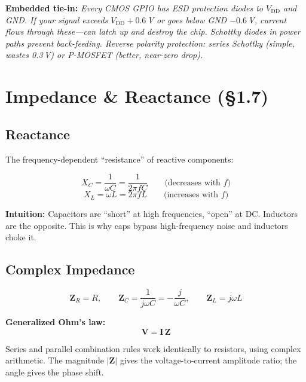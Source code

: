 \documentclass[11pt,a4paper]{article}
\newcommand{\intuition}[1]{\par\textcolor{intuition}{\textbf{Intuition:}} #1}
\newcommand{\embedded}[1]{\par\textcolor{embed}{\textbf{Embedded tie-in:}} \textit{#1}}
\begin{document}
\embedded{Every CMOS GPIO has ESD protection diodes to $V_{\text{DD}}$ and GND. If your signal exceeds $V_{\text{DD}} + 0.6\,$V or goes below GND $- 0.6\,$V, current flows through these---can latch up and destroy the chip. Schottky diodes in power paths prevent back-feeding. Reverse polarity protection: series Schottky (simple, wastes 0.3\,V) or P-MOSFET (better, near-zero drop).}

\section{Impedance \& Reactance (\S1.7)}

\subsection{Reactance}

The frequency-dependent ``resistance'' of reactive components:

\begin{equation}
\boxed{X_C = \frac{1}{\omega C} = \frac{1}{2\pi f C}} \qquad \text{(decreases with }f\text{)}
\end{equation}
\begin{equation}
\boxed{X_L = \omega L = 2\pi f L} \qquad \text{(increases with }f\text{)}
\end{equation}

\intuition{Capacitors are ``short'' at high frequencies, ``open'' at DC. Inductors are the opposite. This is why caps bypass high-frequency noise and inductors choke it.}

\subsection{Complex Impedance}

\begin{equation}
\mathbf{Z}_R = R, \qquad
\mathbf{Z}_C = \frac{1}{j\omega C} = -\frac{j}{\omega C}, \qquad
\mathbf{Z}_L = j\omega L
\end{equation}

\textbf{Generalized Ohm's law:}
\begin{equation}
\mathbf{V} = \mathbf{I}\,\mathbf{Z}
\end{equation}

Series and parallel combination rules work identically to resistors, using complex arithmetic. The magnitude $|\mathbf{Z}|$ gives the voltage-to-current amplitude ratio; the angle gives the phase shift.
\end{document}
